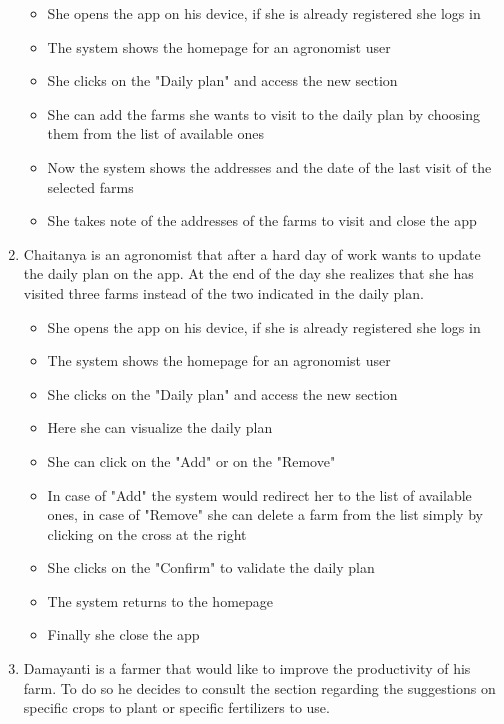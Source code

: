 \documentclass[table, 12pt]{article}
\begin{document}
\begin{enumerate}
    \begin{itemize}
        \item She opens the app on his device, if she is already registered she logs in
        \item The system shows the homepage for an agronomist user
        \item She clicks on the "Daily plan" and access the new section
        \item She can add the farms she wants to visit to the daily plan by choosing them from the list of available ones
        \item Now the system shows the addresses and the date of the last visit of the selected farms
        \item She takes note of the addresses of the farms to visit and close the app
    \end{itemize}
    \item Chaitanya is an agronomist that after a hard day of work wants to update the daily plan on the app.
    At the end of the day she realizes that she has visited three farms instead of the two indicated in the daily plan.
    \begin{itemize}
        \item She opens the app on his device, if she is already registered she logs in
        \item The system shows the homepage for an agronomist user
        \item She clicks on the "Daily plan" and access the new section
        \item Here she can visualize the daily plan
        \item She can click on the "Add" or on the "Remove"
        \item In case of "Add" the system would redirect her to the list of available ones, in case of "Remove" she can delete a farm 
        from the list simply by clicking on the cross at the right
        \item She clicks on the "Confirm" to validate the daily plan
        \item The system returns to the homepage
        \item Finally she close the app
    \end{itemize}
    \item Damayanti is a farmer that would like to improve the productivity of his farm.
    To do so he decides to consult the section regarding the suggestions on specific crops to plant or specific fertilizers to use.

\end{enumerate}
\end{document}
